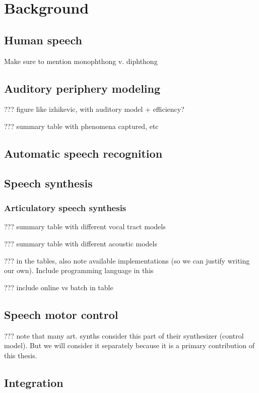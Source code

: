 \chapter{Background}

\section{Human speech}

Make sure to mention monophthong v. diphthong

\section{Auditory periphery modeling}

??? figure like izhikevic, with auditory model + efficiency?

??? summary table with phenomena captured, etc

\section{Automatic speech recognition}

\section{Speech synthesis}

\subsection{Articulatory speech synthesis}

??? summary table with different vocal tract models

??? summary table with different acoustic models

??? in the tables, also note available implementations
(so we can justify writing our own).
Include programming language in this

??? include online vs batch in table

\section{Speech motor control}

??? note that many art. synths consider this part of their
synthesizer (control model).
But we will consider it separately because
it is a primary contribution of this thesis.

\section{Integration}

